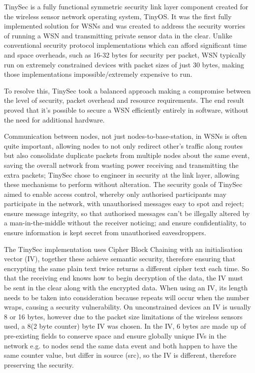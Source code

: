 TinySec is a fully functional symmetric security link layer component created for the wireless sensor network operating system, TinyOS. It was the first fully implemented solution for WSNs and was created to address the security worries of running a WSN and transmitting private sensor data in the clear. Unlike conventional security protocol implementations which can afford significant time and space overheads, such as 16-32 bytes for security per packet, WSN typically run on extremely constrained devices with packet sizes of just 30 bytes, making those implementations impossible/extremely expensive to run.

To resolve this, TinySec took a balanced approach making a compromise between the level of security, packet overhead and resource requirements. The end result proved that it's possible to secure a WSN efficiently entirely in software, without the need for additional hardware. 

Communication between nodes, not just nodes-to-base-station, in WSNs is often quite important, allowing nodes to not only redirect other's traffic along routes but also consolidate duplicate packets from multiple nodes about the same event, saving the overall network from wasting power receiving and transmitting the extra packets; TinySec chose to engineer in security at the link layer, allowing these mechanisms to perform without alteration. The security goals of TinySec aimed to enable access control, whereby only authorised participants may participate in the network, with unauthorised messages easy to spot and reject; ensure message integrity, so that authorised messages can't be illegally altered by a man-in-the-middle without the receiver noticing; and ensure confidentiality, to ensure information is kept secret from unauthorised eavesdroppers. 

The TinySec implementation uses Cipher Block Chaining with an initialisation vector (IV), together these achieve semantic security, therefore ensuring that encrypting the same plain text twice returns a different cipher text each time. So that the receiving end knows how to begin decryption of the data, the IV must be sent in the clear along with the encrypted data. When using an IV, its length needs to be taken into consideration because repeats will occur when the number wraps, causing a security vulnerability. On unconstrained devices an IV is usually 8 or 16 bytes, however due to the packet size limitations of the wireless sensors used, a 8(2 byte counter) byte IV was chosen. In the IV, 6 bytes are made up of pre-existing fields to conserve space and ensure globally unique IVs in the network e.g. to nodes send the same data event and both happen to have the same counter value, but differ in source (src), so the IV is different, therefore preserving the security.

